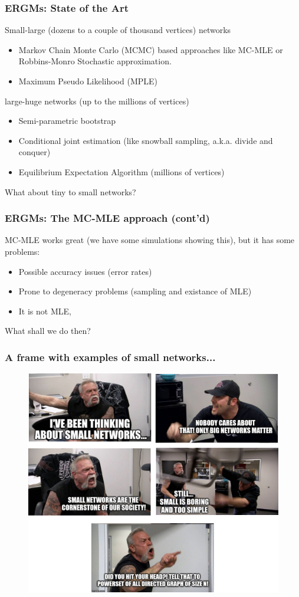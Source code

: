 \documentclass[aspectratio=169, 10pt]{beamer}\usepackage[]{graphicx}\usepackage[]{color}
\begin{document}
\begin{frame}[label=art]
\frametitle{ERGMs: State of the Art}
\pause
Small-large (dozens to a couple of thousand vertices) networks

\begin{itemize}
\item Markov Chain Monte Carlo (MCMC) based approaches like MC-MLE or Robbins-Monro Stochastic approximation. \hyperlink{mcmle}{}
\item Maximum Pseudo Likelihood (MPLE)
\end{itemize}\pause

large-huge networks (up to the millions of vertices)

\begin{itemize}
\item Semi-parametric bootstrap
\item Conditional joint estimation (like snowball sampling, a.k.a. divide and conquer)
\item Equilibrium Expectation Algorithm (millions of vertices)
\end{itemize}\pause

What about tiny to small networks?

\end{frame}

\begin{frame}
\frametitle{ERGMs: The MC-MLE approach (cont'd)}

MC-MLE works great (we have some simulations showing this), but it has some
problems:\pause

\begin{itemize}[<+->]
\item Possible accuracy issues (error rates)
\item Prone to degeneracy problems (sampling and existance of MLE)
\item It is not MLE,
\end{itemize}

What shall we do then?

\end{frame}

\begin{frame}
\frametitle{A frame with examples of small networks...}
\begin{figure}
\centering
\includegraphics[width=.6\linewidth]{american-chopper-argument-ergmitos.png}
\end{figure}
\end{frame}
\end{document}
